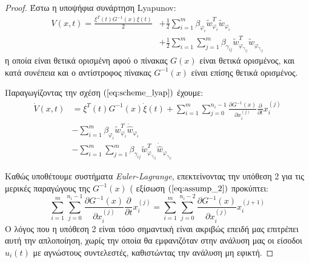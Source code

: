 \begin{proof}
Έστω η υποψήφια συνάρτηση Lyapunov:
\begin{equation}
	\begin{split}
	V(x,t) = \frac{\xi^T(t) G^{-1}(x) \xi(t)}{2} 
		   &+ \frac{1}{2} \sum_{i=1}^{m} \beta_{\varphi_i} 
		   \tilde{w}_{\varphi_i}^{T} \tilde{w}_{\varphi_i} \\
		   &+ \frac{1}{2} \sum_{i=1}^{m} \sum_{j=1}^{m} \beta_{\gamma_{ij}}
		   \tilde{w}_{\varphi_{\gamma_{ij}}}^{T} \tilde{w}_{\varphi_{\gamma_{ij}}}
	\end{split}
	\label{eq:scheme_lyap}
\end{equation}
η οποία είναι θετικά ορισμένη αφού ο πίνακας $G(x)$ είναι θετικά ορισμένος, και κατά συνέπεια και ο αντίστροφος πίνακας $G^{-1}(x)$ είναι επίσης θετικά ορισμένος.

Παραγωγίζοντας την σχέση $(\ref{eq:scheme_lyap})$ έχουμε:
\begin{equation}
\begin{split}
	\dot{V}(x,t) &= \xi^T(t) G^{-1}(x) \dot{\xi}(t)
		   + \sum_{i=1}^{m} \sum_{j=0}^{n_i - 1} 
		     \frac{\partial G^{-1}(x) }{\partial x_i^{(j)}} 
		     \frac{\partial }{\partial t} x_i^{(j)} \\
	& - \sum_{i=1}^{m} \beta_{\varphi_i} 
	\tilde{w}_{\varphi_i}^{T} \dot{\hat{w}}_{\varphi_i} \\
	& - \sum_{i=1}^{m} \sum_{j=1}^{m} \beta_{\gamma_{ij}}
	\tilde{w}_{\varphi_{\gamma_{ij}}}^{T} \dot{\hat{w}}_{\varphi_{\gamma_{ij}}}
\end{split}
\label{eq:scheme_lyap}
\end{equation}

Καθώς υποθέτουμε συστήματα \emph{Euler-Lagrange}, επεκτείνοντας την υπόθεση 2 για τις μερικές παραγώγους της $G^{-1}(x)$ ( εξίσωση $(\ref{eq:assump_2})$ προκύπτει:
\begin{equation*}
	\sum_{i=1}^{m} \sum_{j=0}^{n_i - 1} 
	\frac{\partial G^{-1}(x) }{\partial x_i^{(j)}} 
	\frac{\partial }{\partial t} x_i^{(j)} = 
	\sum_{i=1}^{m} \sum_{j=0}^{n_i - 2} 
	\frac{\partial G^{-1}(x) }{\partial x_i^{(j)}} 
	x_i^{(j +1)}
\end{equation*}
Ο λόγος που η υπόθεση 2 είναι τόσο σημαντική είναι ακριβώς επειδή μας επιτρέπει αυτή την απλοποίηση, χωρίς την οποία θα εμφανιζόταν στην ανάλυση μας οι είσοδοι $u_i(t)$ με αγνώστους συντελεστές, καθιστώντας την ανάλυση μη εφικτή.


\end{proof}
